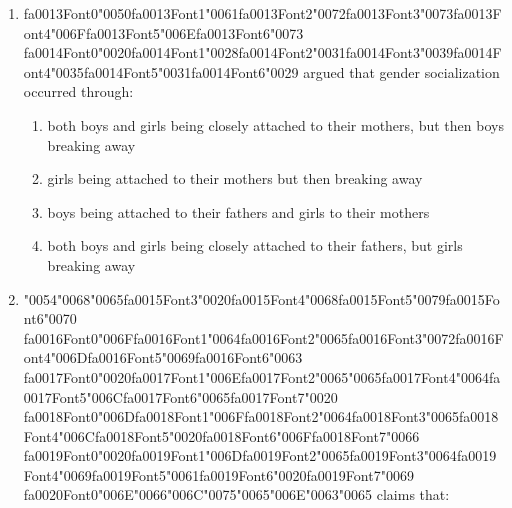 \documentclass[12pt]{article}
\begin{document}
\begin{enumerate}[label=\arabic*.]
\begin{enumerate}[label=(\alph*)]
    \item A primary group
    \item A secondary group
    \item An aggregate
    \item A social category
\end{enumerate}
\item {\csname fa0013Font0\endcsname\char"0050}{\csname fa0013Font1\endcsname\char"0061}{\csname fa0013Font2\endcsname\char"0072}{\csname fa0013Font3\endcsname\char"0073}{\csname fa0013Font4\endcsname\char"006F}{\csname fa0013Font5\endcsname\char"006E}{\csname fa0013Font6\endcsname\char"0073} {\csname fa0014Font0\endcsname\char"0020}{\csname fa0014Font1\endcsname\char"0028}{\csname fa0014Font2\endcsname\char"0031}{\csname fa0014Font3\endcsname\char"0039}{\csname fa0014Font4\endcsname\char"0035}{\csname fa0014Font5\endcsname\char"0031}{\csname fa0014Font6\endcsname\char"0029} argued that gender socialization occurred through:
\begin{enumerate}[label=(\alph*)]
    \item both boys and girls being closely attached to their mothers, but then boys breaking away
    \item girls being attached to their mothers but then breaking away
    \item boys being attached to their fathers and girls to their mothers
    \item both boys and girls being closely attached to their fathers, but girls breaking away
\end{enumerate}
\item {\char"0054}{\char"0068}{\char"0065}{\csname fa0015Font3\endcsname\char"0020}{\csname fa0015Font4\endcsname\char"0068}{\csname fa0015Font5\endcsname\char"0079}{\csname fa0015Font6\endcsname\char"0070} {\csname fa0016Font0\endcsname\char"006F}{\csname fa0016Font1\endcsname\char"0064}{\csname fa0016Font2\endcsname\char"0065}{\csname fa0016Font3\endcsname\char"0072}{\csname fa0016Font4\endcsname\char"006D}{\csname fa0016Font5\endcsname\char"0069}{\csname fa0016Font6\endcsname\char"0063} {\csname fa0017Font0\endcsname\char"0020}{\csname fa0017Font1\endcsname\char"006E}{\csname fa0017Font2\endcsname\char"0065}{\char"0065}{\csname fa0017Font4\endcsname\char"0064}{\csname fa0017Font5\endcsname\char"006C}{\csname fa0017Font6\endcsname\char"0065}{\csname fa0017Font7\endcsname\char"0020} {\csname fa0018Font0\endcsname\char"006D}{\csname fa0018Font1\endcsname\char"006F}{\csname fa0018Font2\endcsname\char"0064}{\csname fa0018Font3\endcsname\char"0065}{\csname fa0018Font4\endcsname\char"006C}{\csname fa0018Font5\endcsname\char"0020}{\csname fa0018Font6\endcsname\char"006F}{\csname fa0018Font7\endcsname\char"0066} {\csname fa0019Font0\endcsname\char"0020}{\csname fa0019Font1\endcsname\char"006D}{\csname fa0019Font2\endcsname\char"0065}{\csname fa0019Font3\endcsname\char"0064}{\csname fa0019Font4\endcsname\char"0069}{\csname fa0019Font5\endcsname\char"0061}{\csname fa0019Font6\endcsname\char"0020}{\csname fa0019Font7\endcsname\char"0069} {\csname fa0020Font0\endcsname\char"006E}{\char"0066}{\char"006C}{\char"0075}{\char"0065}{\char"006E}{\char"0063}{\char"0065} claims that:

\end{enumerate}
\end{document}
